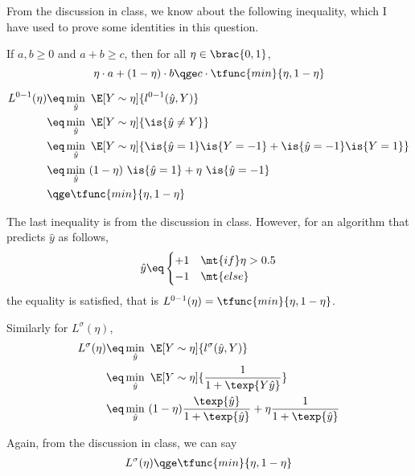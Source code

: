 \documentclass[a4paper,10pt]{article}
\begin{document}
\begin{question}

	\def\wy{\hat{y}}
	\def\sgn{\text{sign}}

	From the discussion in class, we know about the following inequality, which I have used to prove some identities in this question.

	If $a, b \ge 0$ and $a + b \ge c$, then for all $\eta \in \brac{0, 1}$,
	\begin{equation}
		\eta \cdot a + (1 - \eta) \cdot b	\qge	c \cdot \tfunc{min}{\eta, 1 - \eta}
		\label{eq:q1-inequality}
	\end{equation}

	\begin{qpart}{1}

		\begin{align*}
			L^{0-1}(\eta)	&\eq	\min_{\wy}\ \E[Y \sim \eta]{l^{0-1}(\wy, Y)} \\
			&\eq	\min_{\wy}\ \E[Y \sim \eta]{\is{\wy \ne Y}} \\
			&\eq	\min_{\wy}\ \E[Y \sim \eta]{\is{\wy = 1} \is{Y = -1} + \is{\wy = -1} \is{Y = 1}} \\
			&\eq	\min_{\wy}\ (1 - \eta)\ \is{\wy = 1} + \eta\ \is{\wy = -1} \\
			&\qge	\tfunc{min}{\eta, 1 - \eta}
		\end{align*}

		The last inequality is from the discussion in class. However, for an algorithm that predicts $\wy$ as follows,
		\begin{align*}
			\wy	\eq	\begin{cases}
				+1	& \mt{if} \eta > 0.5 \\
				-1	& \mt{else}
			\end{cases}
		\end{align*}
		the equality is satisfied, that is $L^{0-1}(\eta) = \tfunc{min}{\eta, 1 - \eta}$.

		Similarly for $L^{\sigma}(\eta)$,
		\begin{align*}
			L^{\sigma}(\eta)	&\eq	\min_{\wy}\ \E[Y \sim \eta]{l^{\sigma}(\wy, Y)} \\
			&\eq	\min_{\wy}\ \E[Y \sim \eta]{\frac{1}{1 + \texp{Y \wy}}} \\
			&\eq	\min_{\wy}\ (1 - \eta) \frac{\texp{\wy}}{1 + \texp{\wy}} + \eta \frac{1}{1 + \texp{\wy}}
		\end{align*}

		Again, from the discussion in class, we can say
		\begin{align*}
			L^{\sigma}(\eta)	\qge	\tfunc{min}{\eta, 1 - \eta}
		\end{align*}


\end{qpart}
\end{question}
\end{document}
